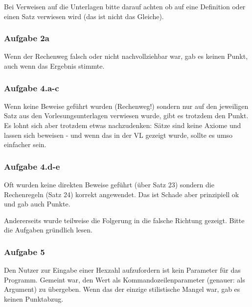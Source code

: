 \documentclass[%
	final, %
	normalheadings, %
	ngerman, %
	a4paper,
	1.1headlines, %
	pagesize, %
	halfparskip, %
	pointlessnumbers, %
	fleqn, %
]{scrartcl} %
\begin{document}
Bei Verweisen auf die Unterlagen bitte darauf achten ob auf eine Definition oder
einen Satz verwiesen wird (das ist nicht das Gleiche).

\subsubsection{Aufgabe 2a}
Wenn der Rechenweg falsch oder nicht nachvollziehbar war, gab es keinen Punkt,
auch wenn das Ergebnis stimmte.


\subsubsection{Aufgabe 4.a-c}
Wenn keine Beweise geführt wurden (Rechenweg!) sondern nur auf den jeweiligen
Satz aus den Vorlesungsunterlagen verwiesen wurde, gibt es trotzdem den Punkt.
Es lohnt sich aber trotzdem etwas nachzudenken: Sätze sind keine Axiome und
lassen sich beweisen - und wenn das in der VL gezeigt wurde, sollte es umso
einfacher sein.

\subsubsection{Aufgabe 4.d-e}
Oft wurden keine direkten Beweise geführt (über Satz 23) sondern die
Rechenregeln (Satz 24) korrekt angewendet. Das ist Schade aber prinzipiell ok
und gab auch Punkte.

Andererseits wurde teilweise die Folgerung in die falsche Richtung gezeigt.
Bitte die Aufgaben gründlich lesen.

\subsubsection{Aufgabe 5}

Den Nutzer zur Eingabe einer Hexzahl aufzufordern ist kein Parameter für das
Programm. Gemeint war, den Wert als Kommandozeilenparameter (genauer: als
Argument) zu übergeben. Wenn das der einzige stilistische Mangel war, gab es
keinen Punktabzug.
\end{document}
